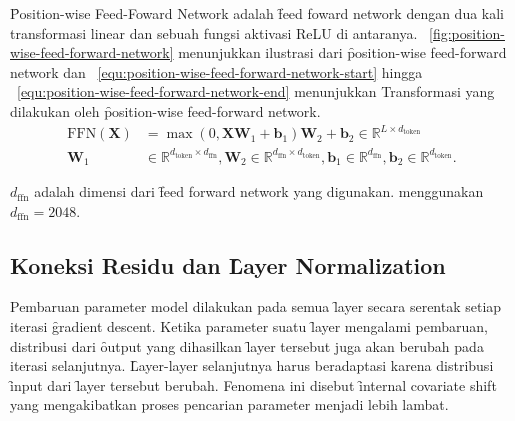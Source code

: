 	\f{Position-wise Feed-Foward Network} adalah \f{feed foward network} dengan dua kali transformasi linear dan sebuah fungsi aktivasi ReLU di antaranya. \pic~\ref{fig:position-wise-feed-forward-network} menunjukkan ilustrasi dari \f{position-wise feed-forward network} dan \equ~\ref{equ:position-wise-feed-forward-network-start} hingga \equ~\ref{equ:position-wise-feed-forward-network-end} menunjukkan Transformasi yang dilakukan oleh \f{position-wise feed-forward network}.
	\begin{align}
		\label{equ:position-wise-feed-forward-network-start}
		\text{FFN}(\mathbf{X}) &= \max(0, \mathbf{X}\mathbf{W}_1 + \mathbf{b}_1)\mathbf{W}_2 + \mathbf{b}_2 \in \mathbb{R}^{L \times d_{\text{token}}} \\
		\label{equ:position-wise-feed-forward-network-end}
		\mathbf{W}_1 &\in \mathbb{R}^{d_{\text{token}} \times d_{\text{ffn}}}, \mathbf{W}_2 \in \mathbb{R}^{d_{\text{ffn}} \times d_{\text{token}}}, \mathbf{b}_1 \in \mathbb{R}^{d_{\text{ffn}}}, \mathbf{b}_2 \in \mathbb{R}^{d_{\text{token}}}.
	\end{align}

	$d_{\text{ffn}}$ adalah dimensi dari \f{feed forward network} yang digunakan. \cite{transformerori} menggunakan $d_{\text{ffn}} = 2048$.

	\subsection{Koneksi Residu dan \f{Layer Normalization}}
	\label{sec:layer-normalization}

	Pembaruan parameter model dilakukan pada semua \f{layer} secara serentak setiap iterasi \f{gradient descent}. Ketika parameter suatu \f{layer} mengalami pembaruan, distribusi dari \f{output} yang dihasilkan \f{layer} tersebut juga akan berubah pada iterasi selanjutnya. \f{Layer-layer} selanjutnya harus beradaptasi karena distribusi \f{input} dari \f{layer} tersebut berubah. Fenomena ini disebut \f{internal covariate shift} yang mengakibatkan proses pencarian parameter menjadi lebih lambat.
	
